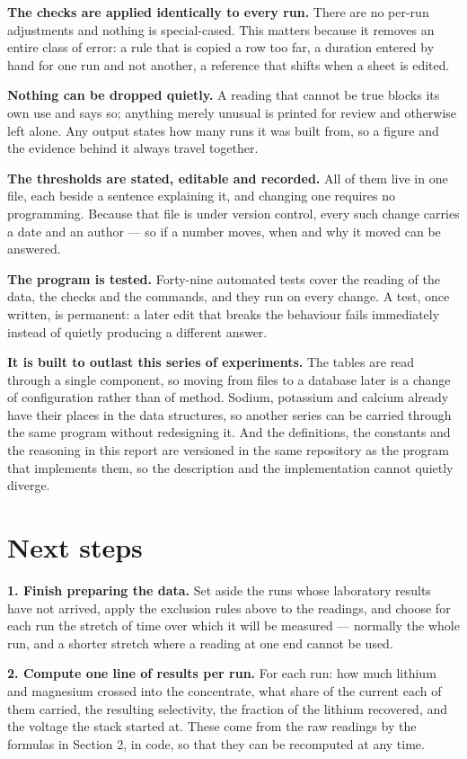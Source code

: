 \documentclass[11pt,a4paper]{article}
\begin{document}
\textbf{The checks are applied identically to every run.} There are no per-run adjustments and
nothing is special-cased. This matters because it removes an entire class of error: a rule that is
copied a row too far, a duration entered by hand for one run and not another, a reference that
shifts when a sheet is edited.

\textbf{Nothing can be dropped quietly.} A reading that cannot be true blocks its own use and
says so; anything merely unusual is printed for review and otherwise left alone. Any output states
how many runs it was built from, so a figure and the evidence behind it always travel together.

\textbf{The thresholds are stated, editable and recorded.} All of them live in one file, each
beside a sentence explaining it, and changing one requires no programming. Because that file is
under version control, every such change carries a date and an author --- so if a number moves,
when and why it moved can be answered.

\textbf{The program is tested.} Forty-nine automated tests cover the reading of the data, the
checks and the commands, and they run on every change. A test, once written, is permanent: a later
edit that breaks the behaviour fails immediately instead of quietly producing a different answer.

\textbf{It is built to outlast this series of experiments.} The tables are read through a single
component, so moving from files to a database later is a change of configuration rather than of
method. Sodium, potassium and calcium already have their places in the data structures, so another
series can be carried through the same program without redesigning it. And the definitions, the
constants and the reasoning in this report are versioned in the same repository as the program
that implements them, so the description and the implementation cannot quietly diverge.

\section{Next steps}

\textbf{1. Finish preparing the data.} Set aside the runs whose laboratory results have not
arrived, apply the exclusion rules above to the readings, and choose for each run the stretch of
time over which it will be measured --- normally the whole run, and a shorter stretch where a
reading at one end cannot be used.

\textbf{2. Compute one line of results per run.} For each run: how much lithium and magnesium
crossed into the concentrate, what share of the current each of them carried, the resulting
selectivity, the fraction of the lithium recovered, and the voltage the stack started at. These
come from the raw readings by the formulas in Section 2, in code, so that they can be recomputed
at any time.
\end{document}
